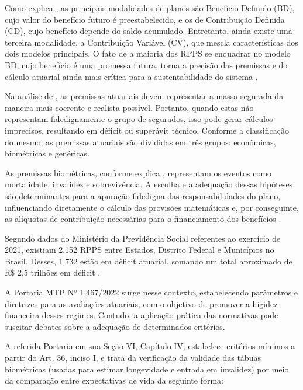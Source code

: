 Como explica , as principais modalidades de planos são Benefício Definido (BD), cujo valor do benefício futuro é preestabelecido, e os de Contribuição Definida (CD), cujo benefício depende do saldo acumulado. Entretanto, ainda existe uma terceira modalidade, a Contribuição Variável (CV), que mescla características dos dois modelos principais. O fato de a maioria dos RPPS se enquadrar no modelo BD, cujo benefício é uma promessa futura, torna a precisão das premissas e do cálculo atuarial ainda mais crítica para a sustentabilidade do sistema \cite{correa2020premissas}.

Na análise de , as premissas atuariais devem representar a massa segurada da maneira mais coerente e realista possível. Portanto, quando estas não representam fidedignamente o grupo de segurados, isso pode gerar cálculos imprecisos, resultando em déficit ou superávit técnico. Conforme a classificação do mesmo, as premissas atuariais são divididas em três grupos: econômicas, biométricas e genéricas.

As premissas biométricas, conforme explica , representam os eventos como mortalidade, invalidez e sobrevivência. A escolha e a adequação dessas hipóteses são determinantes para a apuração fidedigna das responsabilidades do plano, influenciando diretamente o cálculo das provisões matemáticas e, por conseguinte, as alíquotas de contribuição necessárias para o financiamento dos benefícios \cite{correa2020premissas}.

Segundo dados do Ministério da Previdência Social referentes ao exercício de 2021, existiam 2.152 RPPS entre Estados, Distrito Federal e Municípios no Brasil. Desses, 1.732 estão em déficit atuarial, somando um total aproximado de R\$ 2,5 trilhões em déficit \cite{brasil_dados_rpps}.

A Portaria MTP Nº 1.467/2022 surge nesse contexto, estabelecendo parâmetros e diretrizes para as avaliações atuariais, com o objetivo de promover a higidez financeira desses regimes. Contudo, a aplicação prática das normativas pode suscitar debates sobre a adequação de determinados critérios.

A referida Portaria em sua Seção VI, Capítulo IV, estabelece critérios mínimos a partir do Art. 36, inciso I, e trata da verificação da validade das tábuas biométricas (usadas para estimar longevidade e entrada em invalidez) por meio da comparação entre expectativas de vida da seguinte forma:

